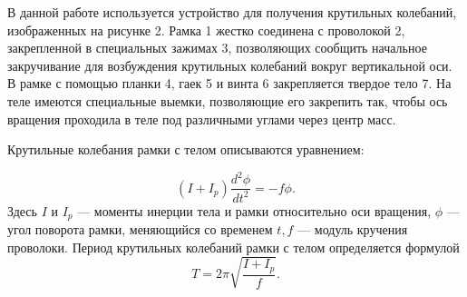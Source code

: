 \documentclass[12pt, a4paper]{article}
\begin{document}
\noindent\begin{minipage}[c]{0.67\textwidth}
	\hspace{1cm}
	

	В данной работе используется устройство для получения крутильных колебаний,
	изображенных на рисунке 2. Рамка 1 жестко соединена с проволокой 2,
	закрепленной в специальных зажимах 3, позволяющих сообщить начальное закручивание для возбуждения крутильных колебаний вокруг вертикальной оси.
	В рамке с помощью планки 4, гаек 5 и винта 6 закрепляется твердое тело 7. 
	На теле имеются специальные выемки, позволяющие его закрепить так, чтобы ось вращения проходила в теле под различными углами через центр масс.


	Крутильные колебания рамки с телом описываются уравнением:

	\begin{equation}
		(I + I_p)\frac{d^2\phi}{dt^2} = -f\phi.
	\end{equation}
Здесь $I$ и $I_p$ --- моменты инерции тела и рамки относительно оси вращения,
$\phi$ --- угол поворота рамки, меняющийся со временем $t, f$ --- модуль кручения проволоки.
Период крутильных колебаний рамки с телом определяется формулой
\begin{equation}
	T = 2\pi\sqrt{\frac{I + I_p}{f}}.
\end{equation}

\end{minipage}
\end{document}
